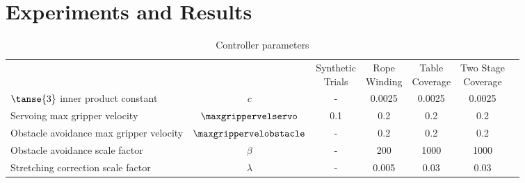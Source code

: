 \section{Experiments and Results}


\begin{table*}[t]
\centering
\caption{Controller parameters}
\label{tab:controller_param_table}
\begin{tabular}{lcccccc}
\hline\noalign{\smallskip}
                                        &                           & \parbox{0.5in}{\centering Synthetic\\Trials} 
                                                                    & \parbox{0.5in}{\centering Rope\\Winding}
                                                                    & \parbox{0.5in}{\centering Table\\Coverage}
                                                                    & \parbox{0.6in}{\centering Two Stage\\Coverage} \\
\noalign{\smallskip}\hline\noalign{\smallskip}
$\tanse{3}$ inner product constant      & $c$                       &   - & 0.0025 & 0.0025 & 0.0025 \\
Servoing max gripper velocity           & $\maxgrippervelservo$     & 0.1 &    0.2 &    0.2 &    0.2 \\
Obstacle avoidance max gripper velocity & $\maxgrippervelobstacle$  &   - &    0.2 &    0.2 &    0.2 \\
Obstacle avoidance scale factor         & $\beta$                   &   - &    200 &   1000 &   1000 \\
Stretching correction scale factor      & $\lambda$                 &   - &  0.005 &   0.03 &   0.03 \\
\hline
\end{tabular}
\end{table*}
